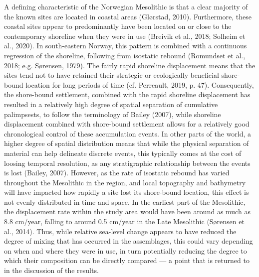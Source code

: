 \documentclass[
]{article}
\begin{document}
A defining characteristic of the Norwegian Mesolithic is that a clear majority of the known sites are located in coastal areas (Glørstad, 2010). Furthermore, these coastal sites appear to predominantly have been located on or close to the contemporary shoreline when they were in use (Breivik et al., 2018; Solheim et al., 2020). In south-eastern Norway, this pattern is combined with a continuous regression of the shoreline, following from isostatic rebound (Romundset et al., 2018; e.g. Sørensen, 1979). The fairly rapid shoreline displacement means that the sites tend not to have retained their strategic or ecologically beneficial shore-bound location for long periods of time (cf. Perreault, 2019, p. 47). Consequently, the shore-bound settlement, combined with the rapid shoreline displacement has resulted in a relatively high degree of spatial separation of cumulative palimpsests, to follow the terminology of Bailey (2007), while shoreline displacement combined with shore-bound settlement allows for a relatively good chronological control of these accumulation events. In other parts of the world, a higher degree of spatial distribution means that while the physical separation of material can help delineate discrete events, this typically comes at the cost of loosing temporal resolution, as any stratigraphic relationship between the events is lost (Bailey, 2007). However, as the rate of isostatic rebound has varied throughout the Mesolithic in the region, and local topography and bathymetry will have impacted how rapidly a site lost its shore-bound location, this effect is not evenly distributed in time and space. In the earliest part of the Mesolithic, the displacement rate within the study area would have been around as much as 8.8 cm/year, falling to around 0.5 cm/year in the Late Mesolithic (Sørensen et al., 2014). Thus, while relative sea-level change appears to have reduced the degree of mixing that has occurred in the assemblages, this could vary depending on when and where they were in use, in turn potentially reducing the degree to which their composition can be directly compared --- a point that is returned to in the discussion of the results.
\end{document}
